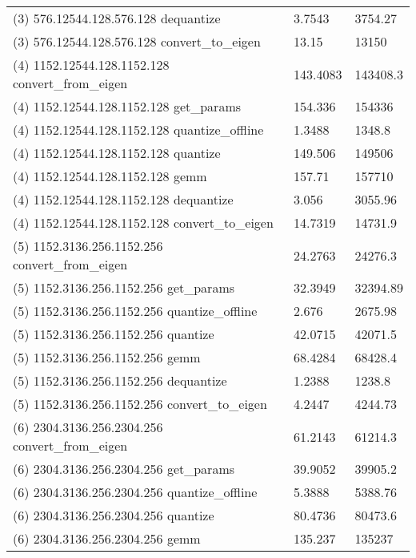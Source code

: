 \begin{longtable}{lll}
(3) 576.12544.128.576.128 dequantize             & 3.7543         & 3754.27          \\
(3) 576.12544.128.576.128 convert\_to\_eigen     & 13.15          & 13150            \\
(4) 1152.12544.128.1152.128 convert\_from\_eigen & 143.4083       & 143408.3         \\
(4) 1152.12544.128.1152.128 get\_params          & 154.336        & 154336           \\
(4) 1152.12544.128.1152.128 quantize\_offline    & 1.3488         & 1348.8           \\
(4) 1152.12544.128.1152.128 quantize             & 149.506        & 149506           \\
(4) 1152.12544.128.1152.128 gemm                 & 157.71         & 157710           \\
(4) 1152.12544.128.1152.128 dequantize           & 3.056          & 3055.96          \\
(4) 1152.12544.128.1152.128 convert\_to\_eigen   & 14.7319        & 14731.9          \\
(5) 1152.3136.256.1152.256 convert\_from\_eigen  & 24.2763        & 24276.3          \\
(5) 1152.3136.256.1152.256 get\_params           & 32.3949        & 32394.89         \\
(5) 1152.3136.256.1152.256 quantize\_offline     & 2.676          & 2675.98          \\
(5) 1152.3136.256.1152.256 quantize              & 42.0715        & 42071.5          \\
(5) 1152.3136.256.1152.256 gemm                  & 68.4284        & 68428.4          \\
(5) 1152.3136.256.1152.256 dequantize            & 1.2388         & 1238.8           \\
(5) 1152.3136.256.1152.256 convert\_to\_eigen    & 4.2447         & 4244.73          \\
(6) 2304.3136.256.2304.256 convert\_from\_eigen  & 61.2143        & 61214.3          \\
(6) 2304.3136.256.2304.256 get\_params           & 39.9052        & 39905.2          \\
(6) 2304.3136.256.2304.256 quantize\_offline     & 5.3888         & 5388.76          \\
(6) 2304.3136.256.2304.256 quantize              & 80.4736        & 80473.6          \\
(6) 2304.3136.256.2304.256 gemm                  & 135.237        & 135237           \\

\end{longtable}
